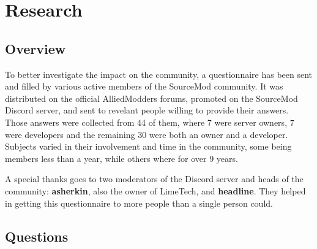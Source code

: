 \chapter{Research}

\section{Overview}

To better investigate the impact on the community, a questionnaire has been sent and filled by various active members of the SourceMod community.
It was distributed on the official AlliedModders forums, promoted on the SourceMod Discord server, and sent to revelant people willing to provide their answers.
Those answers were collected from 44 of them, where 7 were server owners, 7 were developers and the remaining 30 were both an owner and a developer.
Subjects varied in their involvement and time in the community, some being members less than a year, while others where for over 9 years.

A special thanks goes to two moderators of the Discord server and heads of the community: \textbf{asherkin}, also the owner of LimeTech, and \textbf{headline}.
They helped in getting this questionnaire to more people than a single person could.

\section{Questions}

